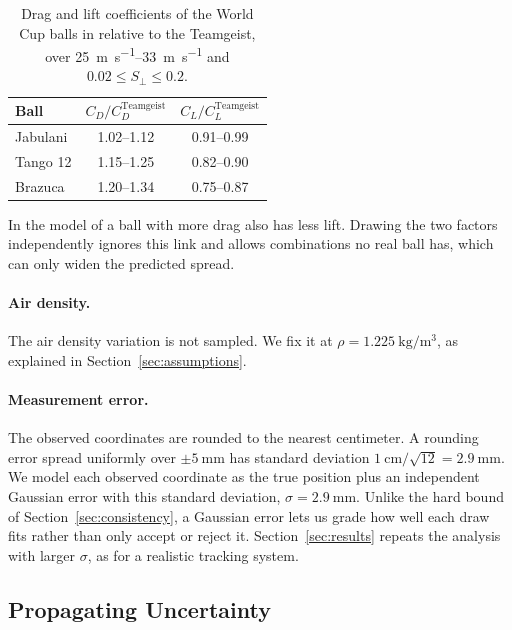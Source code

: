 \documentclass[10pt,a4paper]{article}
\begin{document}
\begin{table}[H]
  \centering
  \caption{Drag and lift coefficients of the World Cup balls in
    \citet{kiratidis2018} relative to the Teamgeist, over
    \SIrange{25}{33}{\metre\per\second} and $0.02 \le S_\perp \le 0.2$.}
  \label{tab:balls}
  \begin{tabular}{lcc}
    \toprule
    Ball & $C_D / C_D^{\mathrm{Teamgeist}}$ & $C_L / C_L^{\mathrm{Teamgeist}}$ \\
    \midrule
    Jabulani & \numrange{1.02}{1.12} & \numrange{0.91}{0.99} \\
    Tango 12 & \numrange{1.15}{1.25} & \numrange{0.82}{0.90} \\
    Brazuca  & \numrange{1.20}{1.34} & \numrange{0.75}{0.87} \\
    \bottomrule
  \end{tabular}
\end{table}

In the model of \citet{kiratidis2018} a ball with more drag also has
less lift. Drawing the two factors independently ignores this link and allows
combinations no real ball has, which can only widen the predicted spread.

\paragraph{Air density.} The air density variation is not sampled. We fix it at
$\rho = \SI{1.225}{\kilo\gram\per\metre\cubed}$, as explained in
Section~\ref{sec:assumptions}.

\paragraph{Measurement error.} The observed coordinates are rounded to the
nearest centimeter. A rounding error spread uniformly over
$\pm\SI{5}{\milli\metre}$ has standard deviation
$\SI{1}{\centi\metre}/\sqrt{12} = \SI{2.9}{\milli\metre}$. We model each
observed coordinate as the true position plus an independent Gaussian error
with this standard deviation, $\sigma = \SI{2.9}{\milli\metre}$. Unlike the
hard bound of Section~\ref{sec:consistency}, a Gaussian error lets us grade
how well each draw fits rather than only accept or reject it.
Section~\ref{sec:results} repeats the analysis with larger $\sigma$, as for a
realistic tracking system.

\subsection{Propagating Uncertainty}
\label{sec:draw}
\end{document}
